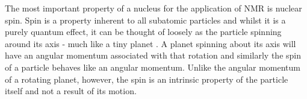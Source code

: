 The most important property of a nucleus for the application of \ac{NMR} is nuclear spin. 
Spin is a property inherent to all subatomic particles and whilst it is a purely quantum effect, it can be thought of loosely as the particle spinning around its axis - much like a tiny planet \cite{Levitt2008}.
A planet spinning about its axis will have an angular momentum associated with that rotation and similarly the spin of a particle behaves like an angular momentum.
Unlike the angular momentum of a rotating planet, however, the spin is an intrinsic property of the particle itself and not a result of its motion\cite{Levitt2008}.


